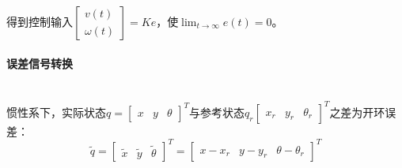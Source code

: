 \documentclass[
12pt, %
a4paper, 
oneside, %
headinclude,footinclude, %
]{scrartcl}
\begin{document}
得到控制输入$ \begin{bmatrix} v(t) \\ \omega(t) \end{bmatrix} = Ke $，使$ \lim_{t \to \infty} e(t) = 0 $。
\paragraph{误差信号转换}~\\

惯性系下，实际状态$ q = \begin{bmatrix} x & y & \theta \end{bmatrix}^T $与参考状态$ q_r \begin{bmatrix} x_r & y_r & \theta_r \end{bmatrix}^T $之差为开环误差：
$$ \tilde{q} = \begin{bmatrix} \tilde{x} & \tilde{y} & \tilde{\theta} \end{bmatrix}^T = \begin{bmatrix} x - x_r & y - y_r & \theta - \theta_r \end{bmatrix}^T $$
\end{document}
